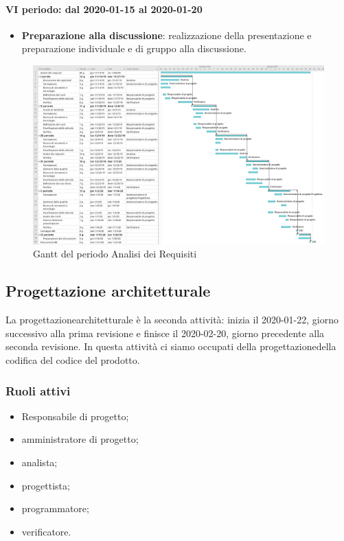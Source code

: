 \paragraph*{VI periodo: dal 2020-01-15 al 2020-01-20}
\begin{itemize}
	\item \textbf{Preparazione alla discussione}: realizzazione della presentazione e preparazione individuale e di gruppo alla discussione.
\end{itemize}

\begin{landscape}
	\begin{figure}[H] 	
		\includegraphics[width=\linewidth]{./gantt/Analisi_dei_Requisiti_datax2.png}	
		\caption{Gantt del periodo Analisi dei Requisiti}	
	\end{figure}
\end{landscape}

\subsection{Progettazione architetturale}
La progettazione\glosp architetturale è la seconda attività: inizia il 2020-01-22, giorno successivo alla prima revisione e finisce il 2020-02-20, giorno precedente alla seconda revisione. In questa attività ci siamo occupati della progettazione\glosp della codifica del codice del prodotto\glo.

\subsubsection{Ruoli attivi}
\begin{itemize}
	\item Responsabile di progetto\glo;
	\item amministratore di progetto\glo;
	\item analista;
	\item progettista;
	\item programmatore;
	\item verificatore.
\end{itemize}

